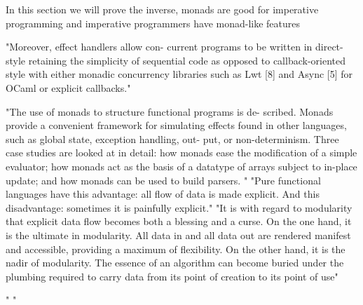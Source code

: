 In this section we will prove the inverse,
monads are good for imperative programming
and imperative programmers have monad-like features



"Moreover, effect handlers allow con- current programs to be written in direct-style retaining the simplicity of sequential code as opposed to callback-oriented style with either monadic concurrency libraries such as Lwt [8] and Async [5] for OCaml or explicit callbacks."
\cite{dolaneffectively}

"The use of monads to structure functional programs is de- scribed. Monads provide a convenient framework for simulating effects found in other languages, such as global state, exception handling, out- put, or non-determinism. Three case studies are looked at in detail: how monads ease the modification of a simple evaluator; how monads act as the basis of a datatype of arrays subject to in-place update; and how monads can be used to build parsers.
"
"Pure functional languages have this advantage: all flow of data is made explicit. And this disadvantage: sometimes it is painfully explicit."
"It is with regard to modularity that explicit data flow becomes both a blessing and a curse. On the one hand, it is the ultimate in modularity. All data in and all data out are rendered manifest and accessible, providing a maximum of flexibility. On the other hand, it is the nadir of modularity. The essence of an algorithm can become buried under the plumbing required to carry data from its point of creation to its point of use"
\cite{wadler1995monads}

"
"\cite{PeytonJones:1993}


